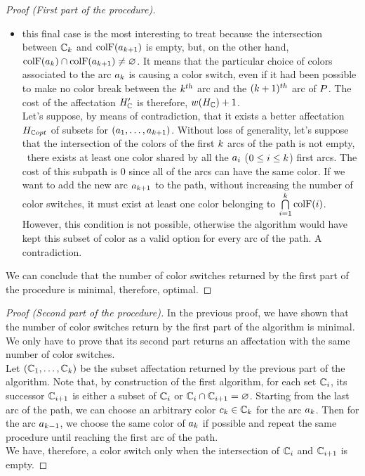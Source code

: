 \begin{proof}[Proof (First part of the procedure)]
\begin{itemize}
\begin{itemize}
            \item this final case is the most interesting to treat because the intersection between $\mathbb{C}_{k}$ and $\text{colF}(a_{k+1})$ is empty, but, on the other hand, $\text{colF}(a_{k}) \cap \text{colF}(a_{k+1}) \neq \varnothing$. It means that the particular choice of colors associated to the arc $a_k$ is causing a color switch, even if it had been possible to make no color break between the $k^{th}$ arc and the  $(k+1)^{th}$ arc of $P$. The cost of the affectation $H_{\mathbb{C}}'$ is therefore, $w(H_{\mathbb{C}}) + 1$.\\
                  Let's suppose, by means of contradiction, that it exists a better affectation $H_{\mathbb{C} opt}$ of subsets for $(a_1,\ldots,a_{k + 1})$. Without loss of generality, let's suppose that the intersection of the colors of the first $k$ arcs of the path is not empty, \ie\ there exists at least one color shared by all the $a_i$ ($0 \leq i \leq k$) first arcs. The cost of this subpath is $0$ since all of the arcs can have the same color. If we want to add the new arc $a_{k + 1}$ to the path, without increasing the number of color switches, it must exist at least one color belonging to $\bigcap\limits_{i = 1}^k \text{colF}(i)$. However, this condition is not possible, otherwise the algorithm would have kept this subset of color as a valid option for every arc of the path. A contradiction.
          \end{itemize}
  \end{itemize}
  We can conclude that the number of color switches returned by the first part of the procedure is minimal, therefore, optimal.
\end{proof}

\begin{proof}[Proof (Second part of the procedure)]
  In the previous proof, we have shown that the number of color switches return by the first part of the algorithm is minimal. We only have to prove that its second part returns an affectation with the same number of color switches.\\
  Let $(\mathbb{C}_1,\ldots,\mathbb{C}_{k})$ be the subset affectation returned by the previous part of the algorithm. Note that, by construction of the first algorithm, for each set $\mathbb{C}_i$, its successor $\mathbb{C}_{i+1}$ is either a subset of $\mathbb{C}_i$ or $\mathbb{C}_i \cap \mathbb{C}_{i+1} = \varnothing$.
  Starting from the last arc of the path, we can choose an arbitrary color $c_k \in \mathbb{C}_k$ for the arc $a_k$. Then for the arc $a_{k-1}$, we choose the same color of $a_k$ if possible and repeat the same procedure until reaching the first arc of the path.\\
  We have, therefore, a color switch only when the intersection of $\mathbb{C}_i$ and $\mathbb{C}_{i+1}$ is empty.
\end{proof}



